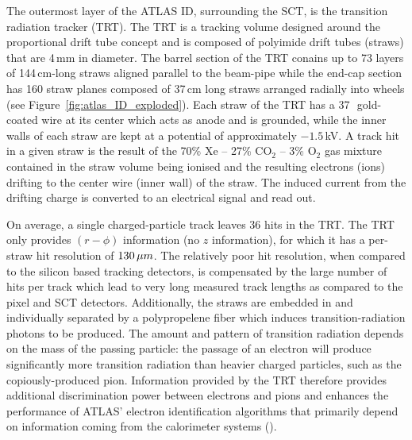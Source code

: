 The outermost layer of the ATLAS ID, surrounding the SCT, is the transition
radiation tracker (TRT).
The TRT is a tracking volume designed around the proportional drift tube concept
and is composed of polyimide drift tubes (straws) that are 4\,mm in diameter.
The barrel section of the TRT conains up to 73 layers of 144\,cm-long straws aligned parallel to the
beam-pipe while the end-cap section has 160 straw planes composed of 37\,cm long straws arranged radially
into wheels (see Figure~\ref{fig:atlas_ID_exploded}).
Each straw of the TRT has a 37\,\micron~gold-coated wire at its center which acts as anode
and is grounded, while the inner walls of each straw are kept at a potential of
approximately $-1.5$\,kV.
A track hit in a given straw is the result of the 70\% Xe -- 27\% CO$_2$ -- 3\% O$_2$ gas mixture contained
in the straw volume being ionised and the resulting electrons (ions) drifting to
the center wire (inner wall) of the straw. The induced current from the drifting
charge is converted to an electrical signal and read out.

On average, a single charged-particle track leaves 36 hits in the TRT.
The TRT only provides $(r-\phi)$ information (no $z$ information),
for which it has a per-straw hit resolution of $130\,\mu m$.
The relatively poor hit resolution, when compared to the silicon based
tracking detectors, is compensated by the large number of hits per track which
lead to very long measured track lengths as compared to the pixel and SCT detectors.
Additionally, the straws are embedded in and individually separated by
a polypropelene fiber which induces transition-radiation photons to be produced.
The amount and pattern of transition radiation depends on the mass of the passing
particle: the passage of an electron will produce significantly more transition radiation
than heavier charged particles, such as the copiously-produced pion.
Information provided by the TRT therefore provides additional discrimination
power between electrons and pions and enhances the performance of ATLAS' electron identification algorithms
that primarily depend on information coming from the calorimeter systems ({\color{red}{Section XXX}}).
